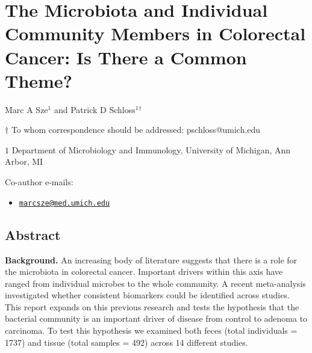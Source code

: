 \documentclass[12pt,]{article}
\title{}
\author{}
\date{}
\providecommand{\tightlist}{%
  \setlength{\itemsep}{0pt}\setlength{\parskip}{0pt}}
\begin{document}
\section{The Microbiota and Individual Community Members in Colorectal
Cancer: Is There a Common
Theme?}\label{the-microbiota-and-individual-community-members-in-colorectal-cancer-is-there-a-common-theme}

\begin{center}
\vspace{25mm}

Marc A Sze${^1}$ and Patrick D Schloss${^1}$${^\dagger}$

\vspace{20mm}

$\dagger$ To whom correspondence should be addressed: pschloss@umich.edu

$1$ Department of Microbiology and Immunology, University of Michigan, Ann Arbor, MI




\end{center}

Co-author e-mails:

\begin{itemize}
\tightlist
\item
  \href{mailto:marcsze@med.umich.edu}{\nolinkurl{marcsze@med.umich.edu}}
\end{itemize}

\newpage

\linenumbers

\subsection{Abstract}\label{abstract}

\textbf{Background.} An increasing body of literature suggests that
there is a role for the microbiota in colorectal cancer. Important
drivers within this axis have ranged from individual microbes to the
whole community. A recent meta-analysis investigated whether consistent
biomarkers could be identified across studies. This report expands on
this previous research and tests the hypothesis that the bacterial
community is an important driver of disease from control to adenoma to
carcinoma. To test this hypothesis we examined both feces (total
individuals = 1737) and tissue (total samples = 492) across 14 different
studies.
\end{document}
